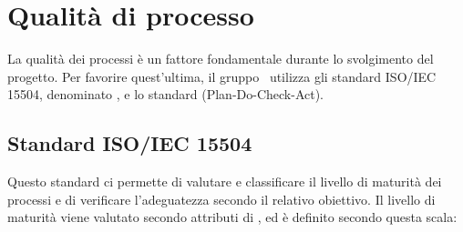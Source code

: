 \documentclass[../PianoDiQualifica.tex]{subfiles}
\begin{document}
\section{Qualità di processo}

	La qualità dei processi è un fattore fondamentale durante lo svolgimento del progetto. Per favorire quest'ultima, il gruppo \kpanic\ utilizza gli standard ISO/IEC 15504, denominato , e lo standard  (Plan-Do-Check-Act).
	
	\subsection{Standard ISO/IEC 15504}
	Questo standard ci permette di valutare e classificare il livello di maturità dei processi e di verificare l'adeguatezza secondo il relativo obiettivo. Il livello di maturità viene valutato secondo attributi di , ed è definito secondo questa scala:
\end{document}
